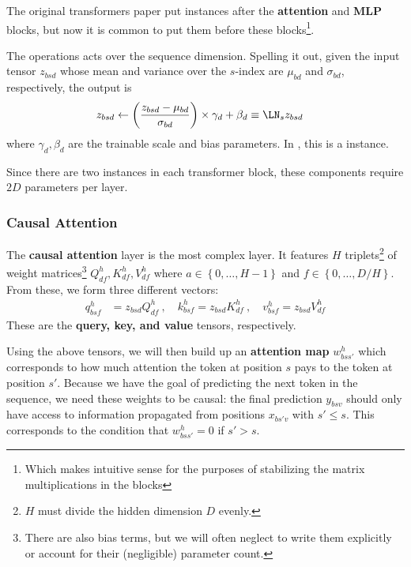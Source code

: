 \documentclass[11pt]{article}
\begin{document}
The original transformers paper \cite{vaswani2017attention} put  instances after
the \textbf{attention} and \textbf{MLP} blocks, but now it is common \cite{xiong2020layer} to put
them before these blocks\footnote{Which makes intuitive sense for the purposes of stabilizing the
matrix multiplications in the blocks}.

The  operations acts over the sequence dimension. Spelling it out, given the
input tensor $ z _{ bsd } $ whose mean and variance over the $ s $-index are $ \mu _{ bd } $ and $
\sigma _{ bd } $, respectively, the  output is
\begin{align}
  z _{ bsd } &\leftarrow \left ( \frac{ z _{ bsd } - \mu _{ bd } }{ \sigma _{ bd } } \right )\times \gamma _{ d }
  + \beta _{ d } \equiv \LN _{ s } z _{ bsd}
\end{align}
where $ \gamma _{ d }, \beta  _{ d } $ are the trainable scale and bias parameters. In
, this is a  instance.

Since there are two  instances in each transformer block, these components require
$ 2D $ parameters per layer.


\subsubsection{Causal Attention \label{subsubsec_attn_layer} }

The \textbf{causal attention} layer is the most complex layer. It features $ H $  triplets\footnote{$ H $
must divide the hidden dimension $ D $ evenly.} of weight matrices\footnote{There are also bias
terms, but we will often neglect to write them explicitly or account for their (negligible)
parameter count.}  $ Q ^{ h } _{ d f }, K ^{ h } _{ df }, V ^{ h } _{ df }  $
where $ a \in \left \{ 0, \ldots, H-1 \right \} $ and $ f \in \left \{ 0, \ldots, D/H \right \} $.
From these, we form three different vectors:
\begin{align}
  q ^{ h }_{ bsf } &= z _{ bsd } Q ^{ h }_{ df } \ , \quad
  k ^{ h }_{ bsf } = z _{ bsd } K ^{ h }_{ df }  \ , \quad
  v ^{ h }_{ bsf } = z _{ bsd } V ^{ h }_{ df }
\end{align}
These are the \textbf{query, key, and value} tensors, respectively.

Using the above tensors, we will then build up an \textbf{attention map}  $ w ^{ h }_{ bss' } $
which corresponds to how much attention the token at position $ s $ pays to the token at
position $ s' $.  Because we have the goal of predicting the
next token in the sequence, we need these weights to be causal: the final prediction $ y _{ bsv } $
should only have access to information propagated from positions $ x _{ bs'v } $ with $ s' \le s $.
This corresponds to the condition that $ w ^{ h }_{ bss' } = 0  $ if  $ s' > s  $.
\end{document}
